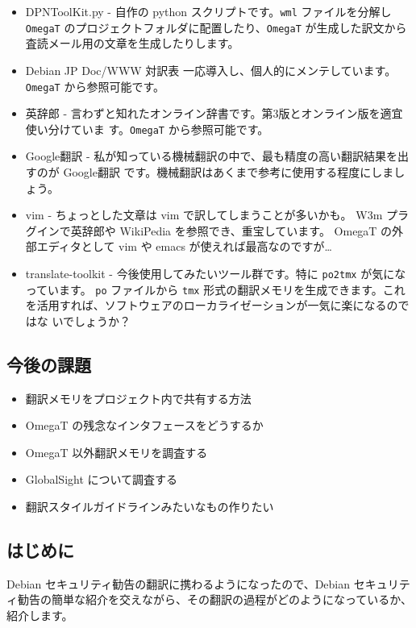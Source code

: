 \documentclass[mingoth,a4paper]{jsarticle}
\begin{document}
\begin{itemize}
\item DPNToolKit.py -
	自作の python スクリプトです。{\tt wml} ファイルを分解し {\tt OmegaT}
	 のプロジェクトフォルダに配置したり、{\tt OmegaT} が生成した訳文から
	査読メール用の文章を生成したりします。
\item Debian JP Doc/WWW 対訳表
    一応導入し、個人的にメンテしています。{\tt OmegaT} から参照可能です。
\item 英辞郎 -
    言わずと知れたオンライン辞書です。第3版とオンライン版を適宜使い分けていま
    す。{\tt OmegaT} から参照可能です。
\item Google翻訳 -
    私が知っている機械翻訳の中で、最も精度の高い翻訳結果を出すのが Google翻訳
    です。機械翻訳はあくまで参考に使用する程度にしましょう。
\item vim -
    ちょっとした文章は vim で訳してしまうことが多いかも。
    W3m プラグインで英辞郎や WikiPedia を参照でき、重宝しています。
    OmegaT の外部エディタとして vim や emacs が使えれば最高なのですが…
\item translate-toolkit -
    今後使用してみたいツール群です。特に {\tt po2tmx} が気になっています。
    {\tt po} ファイルから {\tt tmx} 形式の翻訳メモリを生成できます。これ
    を活用すれば、ソフトウェアのローカライゼーションが一気に楽になるのではな
    いでしょうか？
\end{itemize}

\subsection{今後の課題}
\begin{itemize}
    \item 翻訳メモリをプロジェクト内で共有する方法
    \item OmegaT の残念なインタフェースをどうするか
    \item OmegaT 以外翻訳メモリを調査する
    \item GlobalSight について調査する
    \item 翻訳スタイルガイドラインみたいなもの作りたい
\end{itemize}
\clearpage

\newcommand{\email}[1]{{\tt{}#1}}
\subsection{はじめに}

Debian セキュリティ勧告の翻訳に携わるようになったので、Debian セキュリティ勧告の簡単な紹介を交えながら、その翻訳の過程がどのようになっているか、紹介します。
\end{document}
